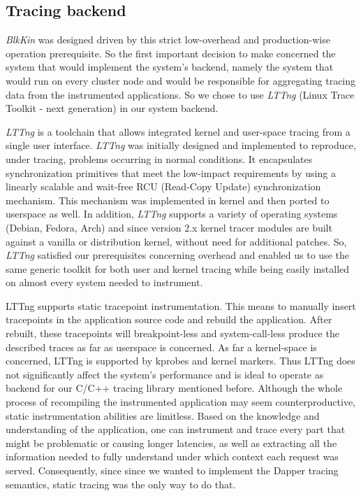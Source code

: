 \documentclass[a4paper,10pt,twocolumn]{article}
\begin{document}
\subsection{Tracing backend} \emph{BlkKin} was designed driven by this strict
low-overhead and production-wise operation prerequisite. So the first important
decision to make concerned the system that would implement the system's backend,
namely the system that would run on every cluster node and would be responsible
for aggregating tracing data from the instrumented applications. So we chose to
use \emph{LTTng} (Linux Trace Toolkit - next generation)\cite{lttng} in our
system backend.

\emph{LTTng} is a toolchain that allows integrated kernel and user-space tracing
from a single user interface. \emph{LTTng} was initially designed and
implemented to reproduce, under tracing, problems occurring in normal
conditions. It encapsulates synchronization primitives that meet the low-impact
requirements by using a linearly scalable and wait-free RCU (Read-Copy Update)
synchronization mechanism. This mechanism was implemented in kernel and then
ported to userspace as well. In addition, \emph{LTTng} supports a variety of
operating systems (Debian, Fedora, Arch) and since version 2.x kernel tracer
modules are built against a vanilla or distribution kernel, without need for
additional patches.  So, \emph{LTTng} satisfied our prerequisites concerning
overhead and enabled us to use the same generic toolkit for both user and kernel
tracing while being easily installed on almost every system needed to
instrument. 

LTTng supports static tracepoint instrumentation. This means to manually insert
tracepoints in the application source code and rebuild the application. After
rebuilt, these tracepoints will breakpoint-less and system-call-less produce the
described traces as far as userspace is concerned. As far a kernel-space is
concerned, LTTng is supported by kprobes and kernel markers. Thus LTTng does not
significantly affect the system's performance and is ideal to operate as backend
for our C/C++ tracing library mentioned before. Although the whole process of
recompiling the instrumented application may seem counterproductive, static
instrumentation abilities are limitless. Based on the knowledge and
understanding of the application, one can instrument and trace every part that
might be problematic or causing longer latencies, as well as extracting all the
information needed to fully understand under which context each request was
served. Consequently, since since we wanted to implement the Dapper tracing
semantics, static tracing was the only way to do that.
\end{document}
